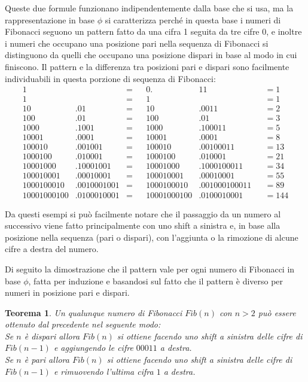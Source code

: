 \documentclass[Lau]{sapthesis}
\newtheorem{theorem}{Teorema}
\begin{document}
Queste due formule funzionano indipendentemente dalla base che si usa, ma la rappresentazione in base $\phi$ si caratterizza perché in questa base i numeri di Fibonacci seguono un pattern fatto da una cifra 1 seguita da tre cifre 0, e inoltre i numeri che occupano una posizione pari nella sequenza di Fibonacci si distinguono da quelli che occupano una posizione dispari in base al modo in cui finiscono. Il pattern e la differenza tra posizioni pari e dispari sono facilmente individuabili in questa porzione di sequenza di Fibonacci:
\begin{align*}
1& & = & & 0.&11 & & = 1 \tag{1}\\
1& & = & & 1& & & = 1 \tag{2}\\
10&.01 & = & & 10&.0011 & & = 2 \tag{3}\\
100&.01 & = & & 100&.01 & & = 3 \tag{4}\\
1000&.1001 & = & & 1000&.100011 & & = 5 \tag{5}\\
10001&.0001 & = & & 10001&.0001 & & = 8 \tag{6}\\
100010&.001001 & = & & 100010&.00100011 & & = 13 \tag{7}\\
1000100&.010001 & = & & 1000100&.010001 & & = 21 \tag{8}\\
10001000&.10001001 & = & & 10001000&.1000100011 & & = 34 \tag{9}\\
100010001&.00010001 & = & & 100010001&.00010001 & & = 55 \tag{10}\\
1000100010&.0010001001 & = & & 1000100010&.001000100011 & & = 89 \tag{11}\\
10001000100&.0100010001 & = & & 10001000100&.0100010001 & & = 144 \tag{12}
\end{align*}

Da questi esempi si può facilmente notare che il passaggio da un numero al successivo viene fatto principalmente con uno shift a sinistra e, in base alla posizione nella sequenza (pari o dispari), con l'aggiunta o la rimozione di alcune cifre a destra del numero.

\medskip

Di seguito la dimostrazione che il pattern vale per ogni numero di Fibonacci in base $\phi$, fatta per induzione e basandosi sul fatto che il pattern è diverso per numeri in posizione pari e dispari.
\begin{theorem}
Un qualunque numero di Fibonacci $Fib(n)$ con $n>2$ può essere ottenuto dal precedente nel seguente modo:\\
Se $n$ è dispari allora $Fib(n)$ si ottiene facendo uno shift a sinistra delle cifre di $Fib(n-1)$ e aggiungendo le cifre $00011$ a destra.\\
Se $n$ è pari allora $Fib(n)$ si ottiene facendo uno shift a sinistra delle cifre di $Fib(n-1)$ e rimuovendo l'ultima cifra $1$ a destra.\\
\end{theorem}
\end{document}

